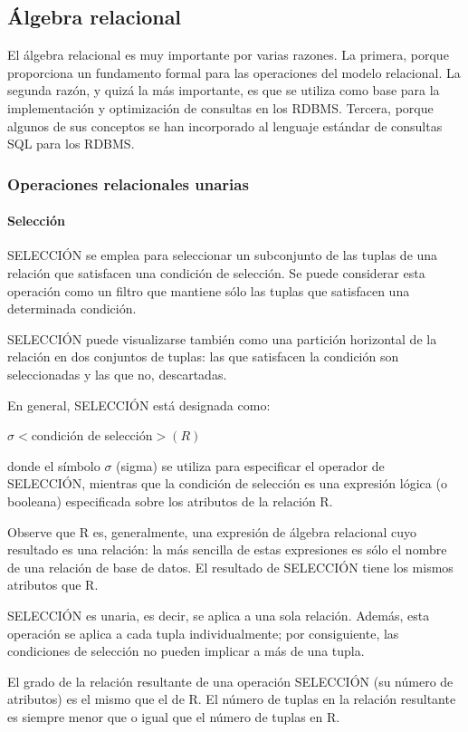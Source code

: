 \subsection{Álgebra relacional}
El álgebra relacional es muy importante por varias razones. La primera, porque proporciona un fundamento formal para las operaciones del modelo relacional. La segunda razón, y quizá la más importante, es que se utiliza como base para la implementación y optimización de consultas en los RDBMS. Tercera, porque algunos de sus conceptos se han incorporado al lenguaje estándar de consultas SQL para los RDBMS.


\subsubsection{Operaciones relacionales unarias}
\paragraph{Selección}

SELECCIÓN se emplea para seleccionar un subconjunto de las tuplas de una relación que satisfacen una condición de selección. Se puede considerar esta operación como un filtro que mantiene sólo las tuplas que satisfacen una determinada condición. 


SELECCIÓN puede visualizarse también como una partición horizontal de la relación en dos conjuntos de tuplas: las que satisfacen la condición son seleccionadas y las que no, descartadas. 


En general, SELECCIÓN está designada como:


$\sigma<$condición de selección$>(R)$


donde el símbolo $\sigma$ (sigma) se utiliza para especificar el operador de SELECCIÓN, mientras que la condición de selección es una expresión lógica (o booleana) especificada sobre los atributos de la relación R. 


Observe que R es, generalmente, una expresión de álgebra relacional cuyo resultado es una relación: la más sencilla de estas expresiones es sólo el nombre de una relación de base de datos. El resultado de SELECCIÓN tiene los mismos atributos que R.


SELECCIÓN es unaria, es decir, se aplica a una sola relación. Además, esta operación se aplica a cada tupla individualmente; por consiguiente, las condiciones de selección no pueden implicar a más de una tupla. 


El grado de la relación resultante de una operación SELECCIÓN (su número de atributos) es el mismo que el de R. El número de tuplas en la relación resultante es siempre menor que o igual que el número de tuplas en R.

